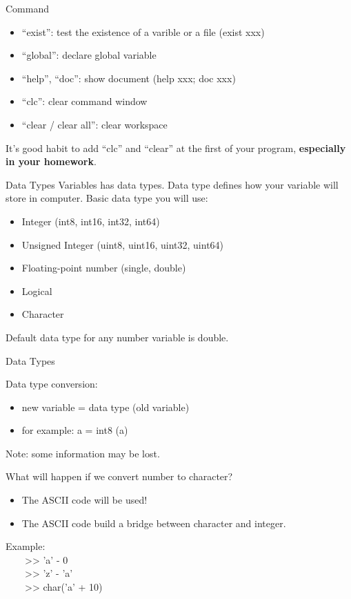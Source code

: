 \begin{frame}{Command}
\begin{itemize}
\item ``exist'': test the existence of a varible or a file (exist xxx)
\item ``global'': declare global variable
\item ``help'', ``doc'': show document (help xxx; doc xxx)
\item ``clc'': clear command window
\item ``clear / clear all'': clear workspace
\end{itemize}
It's good habit to add ``clc'' and ``clear'' at the first of your program, \textbf{especially in your homework}.
\end{frame}

\begin{frame}{Data Types}
Variables has data types. Data type defines how your variable will store in computer. Basic data type you will use: 
\begin{itemize}
\item Integer (int8, int16, int32, int64)
\item Unsigned Integer (uint8, uint16, uint32, uint64)
\item Floating-point number (single, double)
\item Logical
\item Character
\end{itemize}
Default data type for any number variable is double.
\end{frame}

\begin{frame}{Data Types}
\begin{block}{Data type conversion:}
\begin{itemize}
\item new variable = data type (old variable)
\item for example: a = int8 (a)
\end{itemize}
Note: some information may be lost.
\end{block}
What will happen if we convert number to character?
\begin{itemize}
\item The ASCII code will be used!
\item The ASCII code build a bridge between character and integer.
\end{itemize}
Example:\\
\ \ \ \ >> 'a' - 0\\
\ \ \ \ >> 'z' - 'a'\\
\ \ \ \ >> char('a' + 10)\\

\end{frame}

